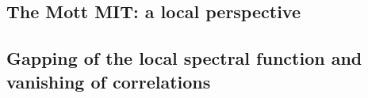 \documentclass[reprint,hidelinks]{revtex4-2}
\begin{document}
\clearpage


\begin{widetext}

\section{The Mott MIT: a local perspective}
\subsection{Gapping of the local spectral function and vanishing of correlations}
%
%

\end{widetext}
\end{document}
